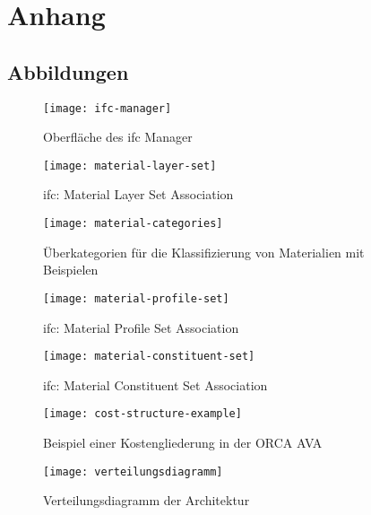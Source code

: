 \chapter{Anhang}
\label{a:append}
\section*{Abbildungen}

\begin{figure}[H]
	\centering
	\texttt{[image: ifc-manager]}
	\caption{Oberfläche des \ac{ifc} Manager}
	\label{fig:ifc-manager}
\end{figure}

\begin{figure}[H]
	\centering
	\texttt{[image: material-layer-set]}
	\caption{\ac{ifc}: Material Layer Set Association}
	\label{fig:layer-set}
\end{figure}

\begin{sidewaysfigure}
	\centering
	\texttt{[image: material-categories]}
	\caption{Überkategorien für die Klassifizierung von Materialien mit Beispielen}
	\label{fig:material-categories}
\end{sidewaysfigure}

\begin{figure}[H]
	\centering
	\texttt{[image: material-profile-set]}
	\caption{\ac{ifc}: Material Profile Set Association}
	\label{fig:profile-set}
\end{figure}

\begin{figure}[H]
	\centering
	\texttt{[image: material-constituent-set]}
	\caption{\ac{ifc}: Material Constituent Set Association}
	\label{fig:constituent-set}
\end{figure}

\begin{figure}[H]
	\centering
	\texttt{[image: cost-structure-example]}
	\caption{Beispiel einer Kostengliederung in der ORCA AVA}
	\label{fig:cost-structure}
\end{figure}

\begin{figure}[H]
	\centering
	\texttt{[image: verteilungsdiagramm]}
	\caption{Verteilungsdiagramm der Architektur}
	\label{fig:distribution-diagramm}
\end{figure}


